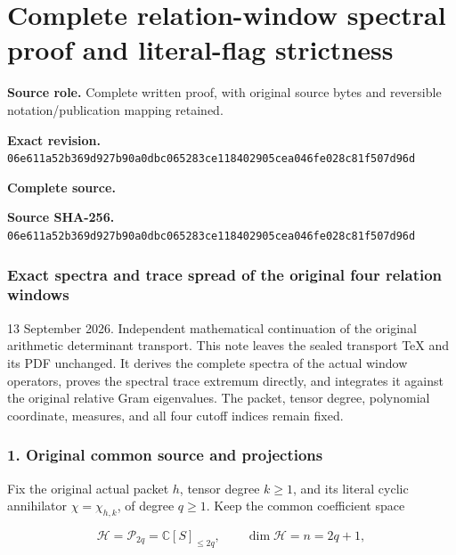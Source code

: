 \begingroup

\section{Complete relation-window spectral proof and literal-flag strictness}


\begingroup
\sloppy
\small

\noindent\textbf{Source role.} Complete written proof, with original source bytes and reversible notation/publication mapping retained.\par
\noindent\textbf{Exact revision.} \nolinkurl{06e611a52b369d927b90a0dbc065283ce118402905cea046fe028c81f507d96d}\par
\noindent\textbf{Complete source.} \par
\noindent\textbf{Source SHA-256.} \nolinkurl{06e611a52b369d927b90a0dbc065283ce118402905cea046fe028c81f507d96d}\par\medskip
\subsubsection{Exact spectra and trace spread of the original four relation windows}\label{endpoint-window_review--exact-spectra-and-trace-spread-of-the-original-four-relation-windows}

13 September 2026. Independent mathematical continuation of the original arithmetic determinant transport. This note leaves the sealed transport TeX and its PDF unchanged. It derives the complete spectra of the actual window operators, proves the spectral trace extremum directly, and integrates it against the original relative Gram eigenvalues. The packet, tensor degree, polynomial coordinate, measures, and all four cutoff indices remain fixed.

\subsubsection{1. Original common source and projections}\label{endpoint-window_review--original-common-source-and-projections}

Fix the original actual packet \(h\), tensor degree \(k\ge1\), and its literal cyclic annihilator \(\chi=\chi_{h,k}\), of degree \(q\ge1\). Keep the common coefficient space

\[
\mathcal H=\mathcal P_{2q}=\mathbb C[S]_{\le2q},
\qquad \dim\mathcal H=n=2q+1,
\tag{WS1}
\]

